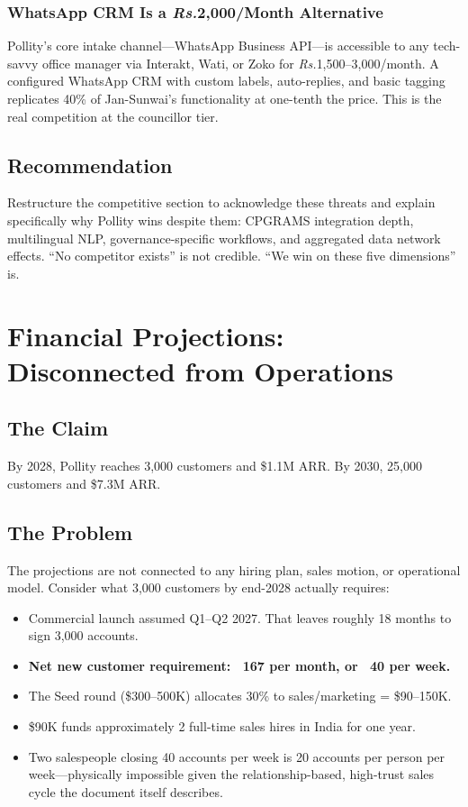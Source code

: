 \documentclass[12pt, a4paper]{article}
\newcommand{\rupee}{\textit{Rs.}}
\begin{document}
\subsubsection{WhatsApp CRM Is a \rupee{}2,000/Month Alternative}
Pollity's core intake channel---WhatsApp Business API---is accessible to any tech-savvy office manager via Interakt, Wati, or Zoko for \rupee{}1,500--3,000/month. A configured WhatsApp CRM with custom labels, auto-replies, and basic tagging replicates 40\% of Jan-Sunwai's functionality at one-tenth the price. This is the real competition at the councillor tier.

\subsection{Recommendation}
Restructure the competitive section to acknowledge these threats and explain specifically why Pollity wins despite them: CPGRAMS integration depth, multilingual NLP, governance-specific workflows, and aggregated data network effects. ``No competitor exists'' is not credible. ``We win on these five dimensions'' is.

\newpage

\section{Financial Projections: Disconnected from Operations}

\subsection{The Claim}
By 2028, Pollity reaches 3,000 customers and \$1.1M ARR. By 2030, 25,000 customers and \$7.3M ARR.

\subsection{The Problem}

The projections are not connected to any hiring plan, sales motion, or operational model. Consider what 3,000 customers by end-2028 actually requires:

\begin{itemize}[leftmargin=1.5em]
    \item Commercial launch assumed Q1--Q2 2027. That leaves roughly 18 months to sign 3,000 accounts.
    \item \textbf{Net new customer requirement: ~167 per month, or ~40 per week.}
    \item The Seed round (\$300--500K) allocates 30\% to sales/marketing = \$90--150K.
    \item \$90K funds approximately 2 full-time sales hires in India for one year.
    \item Two salespeople closing 40 accounts per week is 20 accounts per person per week---physically impossible given the relationship-based, high-trust sales cycle the document itself describes.
\end{itemize}
\end{document}
